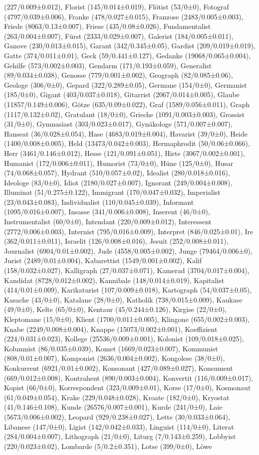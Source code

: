 \begin{styleMoutonText}
(227/0.009±0.012), Florist (145/0.014±0.019), Flötist (53/0±0), Fotograf (4797/0.039±0.006), Franke (478/0.027±0.015), Franzose (2483/0.005±0.003), Friede (8063/0.13±0.007), Friese (435/0.08±0.026), Fundamentalist (263/0.004±0.007), Fürst (2333/0.029±0.007), Galerist (184/0.005±0.011), Ganove (230/0.013±0.015), Garant (342/0.345±0.05), Gardist (209/0.019±0.019), Gatte (374/0.011±0.01), Geck (59/0.441±0.127), Gedanke (19068/0.065±0.004), Gehilfe (573/0.002±0.003), Gendarm (171/0.193±0.059), Generalist (89/0.034±0.038), Genosse (779/0.001±0.002), Geograph (82/0.085±0.06), Geologe (306/0±0), Gepard (322/0.289±0.05), Germane (154/0±0), Germanist (185/0±0), Gigant (403/0.037±0.018), Gitarrist (2067/0.014±0.005), Glaube (11857/0.149±0.006), Götze (635/0.09±0.022), Graf (1589/0.056±0.011), Graph (1117/0.132±0.02), Gratulant (18/0±0), Grieche (1091/0.003±0.003), Grossist (31/0±0), Gymnasiast (303/0.023±0.017), Gynäkologe (571/0.007±0.007), Hanseat (36/0.028±0.054), Hase (4683/0.019±0.004), Havarist (39/0±0), Heide (1400/0.008±0.005), Held (13473/0.042±0.003), Hermaphrodit (50/0.06±0.066), Herr (3461/0.146±0.012), Hesse (121/0.091±0.051), Hirte (3067/0.002±0.001), Humanist (172/0.006±0.011), Humorist (73/0±0), Hüne (125/0±0), Husar (74/0.068±0.057), Hydrant (510/0.057±0.02), Idealist (280/0.018±0.016), Ideologe (83/0±0), Idiot (2180/0.027±0.007), Ignorant (249/0.004±0.008), Illuminat (51/0.275±0.122), Immigrant (170/0.047±0.032), Imperialist (23/0.043±0.083), Individualist (110/0.045±0.039), Informant (1095/0.016±0.007), Insasse (341/0.006±0.008), Inserent (46/0±0), Instrumentalist (60/0±0), Intendant (220/0.009±0.012), Interessent (2772/0.006±0.003), Internist (795/0.016±0.009), Interpret (846/0.025±0.01), Ire (362/0.011±0.011), Israelit (126/0.008±0.016), Jesuit (252/0.008±0.011), Journalist (6904/0.01±0.002), Jude (4558/0.005±0.002), Junge (79464/0.006±0), Jurist (2489/0.01±0.004), Kabarettist (1549/0.001±0.002), Kalif (158/0.032±0.027), Kalligraph (27/0.037±0.071), Kamerad (3704/0.017±0.004), Kandidat (8728/0.012±0.002), Kannibale (148/0.014±0.019), Kapitalist (414/0.01±0.009), Karikaturist (107/0.009±0.018), Kartograph (54/0.037±0.05), Kasache (43/0±0), Katalane (28/0±0), Katholik (738/0.015±0.009), Kaukase (49/0±0), Kelte (65/0±0), Kentaur (45/0.244±0.126), Kirgise (22/0±0), Kleptomane (15/0±0), Klient (1700/0.011±0.005), Klingone (655/0.002±0.003), Knabe (2249/0.008±0.004), Knappe (15073/0.002±0.001), Koeffizient (224/0.031±0.023), Kollege (25536/0.009±0.001), Kolonist (109/0.018±0.025), Kolumnist (86/0.035±0.039), Komet (1669/0.023±0.007), Kommunist (808/0.01±0.007), Komponist (2636/0.004±0.002), Kongolese (38/0±0), Konkurrent (6921/0.01±0.002), Konsonant (427/0.089±0.027), Konsument (669/0.012±0.008), Kontrahent (890/0.003±0.004), Konvertit (116/0.009±0.017), Kopist (66/0±0), Korrespondent (323/0.009±0.01), Korse (17/0±0), Kosmonaut (61/0.049±0.054), Krake (229/0.048±0.028), Kroate (182/0±0), Kryostat (41/0.146±0.108), Kunde (26576/0.007±0.001), Kurde (241/0±0), Laie (5673/0.006±0.002), Leopard (929/0.238±0.027), Lette (30/0.033±0.064), Libanese (147/0±0), Ligist (142/0.042±0.033), Linguist (114/0±0), Literat (284/0.004±0.007), Lithograph (21/0±0), Liturg (7/0.143±0.259), Lobbyist (220/0.023±0.02), Lombarde (5/0.2±0.351), Lotse (399/0±0), Löwe 
\end{styleMoutonText}

